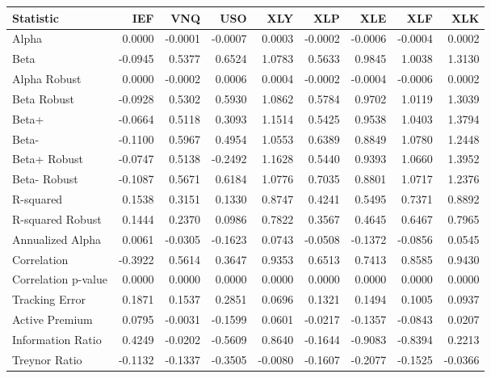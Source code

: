 \begin{tabular}{lrrrrrrrr}
\toprule
Statistic & IEF & VNQ & USO & XLY & XLP & XLE & XLF & XLK \\
\midrule
Alpha & 0.0000 & -0.0001 & -0.0007 & 0.0003 & -0.0002 & -0.0006 & -0.0004 & 0.0002 \\
Beta & -0.0945 & 0.5377 & 0.6524 & 1.0783 & 0.5633 & 0.9845 & 1.0038 & 1.3130 \\
Alpha Robust & 0.0000 & -0.0002 & 0.0006 & 0.0004 & -0.0002 & -0.0004 & -0.0006 & 0.0002 \\
Beta Robust & -0.0928 & 0.5302 & 0.5930 & 1.0862 & 0.5784 & 0.9702 & 1.0119 & 1.3039 \\
Beta+ & -0.0664 & 0.5118 & 0.3093 & 1.1514 & 0.5425 & 0.9538 & 1.0403 & 1.3794 \\
Beta- & -0.1100 & 0.5967 & 0.4954 & 1.0553 & 0.6389 & 0.8849 & 1.0780 & 1.2448 \\
Beta+ Robust & -0.0747 & 0.5138 & -0.2492 & 1.1628 & 0.5440 & 0.9393 & 1.0660 & 1.3952 \\
Beta- Robust & -0.1087 & 0.5671 & 0.6184 & 1.0776 & 0.7035 & 0.8801 & 1.0717 & 1.2376 \\
R-squared & 0.1538 & 0.3151 & 0.1330 & 0.8747 & 0.4241 & 0.5495 & 0.7371 & 0.8892 \\
R-squared Robust & 0.1444 & 0.2370 & 0.0986 & 0.7822 & 0.3567 & 0.4645 & 0.6467 & 0.7965 \\
Annualized Alpha & 0.0061 & -0.0305 & -0.1623 & 0.0743 & -0.0508 & -0.1372 & -0.0856 & 0.0545 \\
Correlation & -0.3922 & 0.5614 & 0.3647 & 0.9353 & 0.6513 & 0.7413 & 0.8585 & 0.9430 \\
Correlation p-value & 0.0000 & 0.0000 & 0.0000 & 0.0000 & 0.0000 & 0.0000 & 0.0000 & 0.0000 \\
Tracking Error & 0.1871 & 0.1537 & 0.2851 & 0.0696 & 0.1321 & 0.1494 & 0.1005 & 0.0937 \\
Active Premium & 0.0795 & -0.0031 & -0.1599 & 0.0601 & -0.0217 & -0.1357 & -0.0843 & 0.0207 \\
Information Ratio & 0.4249 & -0.0202 & -0.5609 & 0.8640 & -0.1644 & -0.9083 & -0.8394 & 0.2213 \\
Treynor Ratio & -0.1132 & -0.1337 & -0.3505 & -0.0080 & -0.1607 & -0.2077 & -0.1525 & -0.0366 \\
\bottomrule
\end{tabular}
